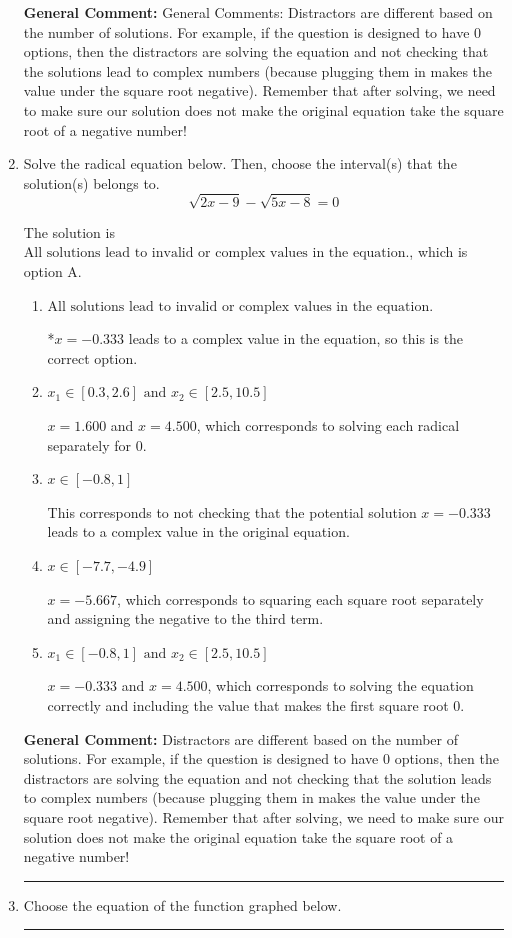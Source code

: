 \documentclass{extbook}[14pt]
\newcommand{\litem}[1]{\item #1

\rule{\textwidth}{0.4pt}}
\begin{document}
\begin{enumerate}
{\textbf{General Comment:} General Comments: Distractors are different based on the number of solutions. For example, if the question is designed to have 0 options, then the distractors are solving the equation and not checking that the solutions lead to complex numbers (because plugging them in makes the value under the square root negative). Remember that after solving, we need to make sure our solution does not make the original equation take the square root of a negative number!
}
\litem{
Solve the radical equation below. Then, choose the interval(s) that the solution(s) belongs to.
\[ \sqrt{2 x - 9} - \sqrt{5 x - 8} = 0 \]

The solution is \( \text{All solutions lead to invalid or complex values in the equation.} \), which is option A.\begin{enumerate}[label=\Alph*.]
\item \( \text{All solutions lead to invalid or complex values in the equation.} \)

*$x = -0.333$ leads to a complex value in the equation, so this is the correct option.
\item \( x_1 \in [0.3, 2.6] \text{ and } x_2 \in [2.5,10.5] \)

$x = 1.600$ and $x = 4.500$, which corresponds to solving each radical separately for 0.
\item \( x \in [-0.8,1] \)

This corresponds to not checking that the potential solution $x = -0.333$ leads to a complex value in the original equation.
\item \( x \in [-7.7,-4.9] \)

$x = -5.667$, which corresponds to squaring each square root separately and assigning the negative to the third term.
\item \( x_1 \in [-0.8, 1] \text{ and } x_2 \in [2.5,10.5] \)

$x = -0.333$ and $x = 4.500$, which corresponds to solving the equation correctly and including the value that makes the first square root 0.
\end{enumerate}

\textbf{General Comment:} Distractors are different based on the number of solutions. For example, if the question is designed to have 0 options, then the distractors are solving the equation and not checking that the solution leads to complex numbers (because plugging them in makes the value under the square root negative). Remember that after solving, we need to make sure our solution does not make the original equation take the square root of a negative number!
}
\litem{
Choose the equation of the function graphed below.

}
\end{enumerate}
\end{document}
